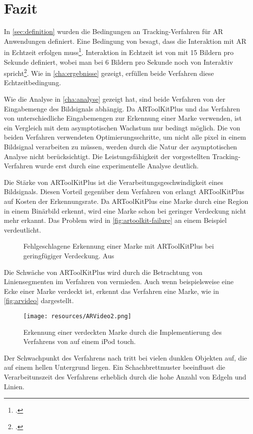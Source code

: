 \chapter{Fazit} %
\label{cha:fazit}
In \autoref{sec:definition} wurden die Bedingungen an Tracking-Verfahren für \gls{AR} Anwendungen definiert. Eine
 Bedingung von \citeauthor{azuma97} besagt, dass die Interaktion mit \gls{AR} in Echtzeit erfolgen
 muss\footcite{azuma97}. Interaktion in Echtzeit ist von \citeauthor{moeller2008} mit 15 Bildern pro Sekunde definiert,
 wobei man bei 6 Bildern pro Sekunde noch von Interaktiv spricht\footcite{moeller2008}. Wie in
 \autoref{cha:ergebnisse} gezeigt, erfüllen beide Verfahren diese Echtzeitbedingung.

Wie die Analyse in \autoref{cha:analyse} gezeigt hat, sind beide Verfahren von der Eingabemenge des Bildsignals
 abhängig. Da ARToolKitPlus und das Verfahren von \citeauthor{hirzer08} unterschiedliche Eingabemengen zur Erkennung
 einer Marke verwenden, ist ein Vergleich mit dem asymptotischen Wachstum nur bedingt möglich. Die von beiden Verfahren
 verwendeten Optimierungsschritte, um nicht alle \gls{pixel} in einem Bildsignal verarbeiten zu müssen, werden durch
 die Natur der asymptotischen Analyse nicht berücksichtigt. Die Leistungsfähigkeit der vorgestellten Tracking-Verfahren
 wurde erst durch eine experimentelle Analyse deutlich.

Die Stärke von ARToolKitPlus ist die Verarbeitungsgeschwindigkeit eines Bildsignals. Diesen Vorteil gegenüber dem
 Verfahren von \citeauthor{hirzer08} erlangt ARToolKitPlus auf Kosten der Erkennungsrate. Da ARToolKitPlus eine Marke
 durch eine Region in einem Binärbild erkennt, wird eine Marke schon bei geringer Verdeckung nicht mehr erkannt. Das
 Problem wird in \autoref{fig:artoolkit-failure} an einem Beispiel verdeutlicht.
\begin{figure}[!ht]
	\centering
	\caption{Fehlgeschlagene Erkennung einer Marke mit ARToolKitPlus bei geringfügiger Verdeckung. Aus
	 \cite{fiala2004artagb}}
	\label{fig:artoolkit-failure}
\end{figure}

Die Schwäche von ARToolKitPlus wird durch die Betrachtung von Liniensegmenten im Verfahren von \citeauthor{hirzer08}
 vermieden. Auch wenn beispielsweise eine Ecke einer Marke verdeckt ist, erkennt das Verfahren eine Marke, wie in
 \autoref{fig:arvideo} dargestellt.
\begin{figure}[!ht]
	\centering
	\texttt{[image: resources/ARVideo2.png]}
	\caption{Erkennung einer verdeckten Marke durch die Implementierung des Verfahrens von \citeauthor{hirzer08} auf
	 einem iPod touch.}
	\label{fig:arvideo}
\end{figure}
Der Schwachpunkt des Verfahrens nach \citeauthor{hirzer08} tritt bei vielen dunklen Objekten auf, die auf einem hellen
 Untergrund liegen. Ein Schachbrettmuster beeinflusst die Verarbeitunszeit des Verfahrens erheblich durch die hohe
 Anzahl von Edgeln und Linien.

